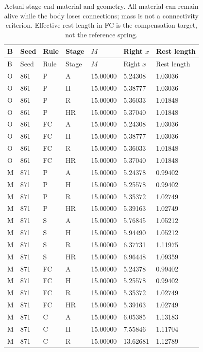 \begin{longtable}{lllllll}
\caption{Actual stage-end material and geometry. All material can remain alive while the body loses connections; mass is not a connectivity criterion. Effective rest length in FC is the compensation target, not the reference spring.}\label{tab:contact-structure}\\
\toprule
B & Seed & Rule & Stage & $M$ & Right $x$ & Rest length\\
\midrule\endfirsthead
\toprule
B & Seed & Rule & Stage & $M$ & Right $x$ & Rest length\\
\midrule\endhead
O & 861 & P & A & 15.00000 & 5.24308 & 1.03036\\
O & 861 & P & H & 15.00000 & 5.38777 & 1.03036\\
O & 861 & P & R & 15.00000 & 5.36033 & 1.01848\\
O & 861 & P & HR & 15.00000 & 5.37040 & 1.01848\\
O & 861 & FC & A & 15.00000 & 5.24308 & 1.03036\\
O & 861 & FC & H & 15.00000 & 5.38777 & 1.03036\\
O & 861 & FC & R & 15.00000 & 5.36033 & 1.01848\\
O & 861 & FC & HR & 15.00000 & 5.37040 & 1.01848\\
M & 871 & P & A & 15.00000 & 5.24378 & 0.99402\\
M & 871 & P & H & 15.00000 & 5.25578 & 0.99402\\
M & 871 & P & R & 15.00000 & 5.35372 & 1.02749\\
M & 871 & P & HR & 15.00000 & 5.39163 & 1.02749\\
M & 871 & S & A & 15.00000 & 5.76845 & 1.05212\\
M & 871 & S & H & 15.00000 & 5.94490 & 1.05212\\
M & 871 & S & R & 15.00000 & 6.37731 & 1.11975\\
M & 871 & S & HR & 15.00000 & 6.96448 & 1.09359\\
M & 871 & FC & A & 15.00000 & 5.24378 & 0.99402\\
M & 871 & FC & H & 15.00000 & 5.25578 & 0.99402\\
M & 871 & FC & R & 15.00000 & 5.35372 & 1.02749\\
M & 871 & FC & HR & 15.00000 & 5.39163 & 1.02749\\
M & 871 & C & A & 15.00000 & 6.05385 & 1.13183\\
M & 871 & C & H & 15.00000 & 7.55846 & 1.11704\\
M & 871 & C & R & 15.00000 & 13.62681 & 1.12789\\

\end{longtable}
